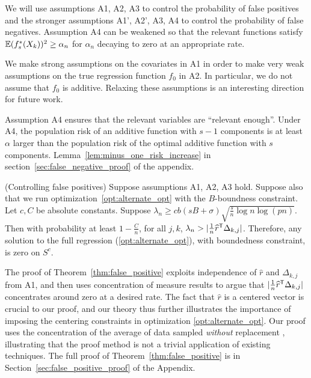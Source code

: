 We will use assumptions A1, A2, A3 to control the probability of false
positives and the stronger assumptions A1', A2', A3, A4 to control the
probability of false negatives.  Assumption A4 can be
weakened so that the relevant functions satisfy
${\mathbb E}(f^*_s(X_k))^2 \geq \alpha_n$ for $\alpha_n$ decaying to zero 
at an appropriate rate.



\begin{remark}
  We make strong assumptions on the covariates in A1 in order to make
  very weak assumptions on the true regression function $f_0$ in
  A2. In particular, we do not assume that $f_0$ is additive. Relaxing
  these assumptions is an interesting direction for future work. 
\end{remark}

\begin{remark}
Assumption A4 ensures that the relevant variables are ``relevant enough''. Under A4, the population risk of an additive function with $s-1$ components is at least $\alpha$ larger than the population risk of the optimal additive function with $s$ components. Lemma~\ref{lem:minus_one_risk_increase} in section~\ref{sec:false_negative_proof} of the appendix.
\end{remark}

\begin{theorem} (Controlling false positives) 
\label{thm:false_positive}
Suppose assumptions A1, A2, A3 hold. Suppose also that we run optimization~\eqref{opt:alternate_opt} with the $B$-boundness constraint. Let $c,C$ be absolute constants.
Suppose $\lambda_n \geq c b (sB + \sigma) \sqrt{ \frac{s}{n} \log n
  \log (pn)}$.  Then with probability at least $ 1 - \frac{C}{n}$, for all $j,k$, $\lambda_n >  | \frac{1}{n} \widehat{r}^{\mathsf{T}} \Delta_{k,j}|$.
Therefore, any solution to the full regression (\ref{opt:alternate_opt}), with boundedness constraint, is zero on $S^c$. 
\end{theorem}

The proof of Theorem~\ref{thm:false_positive} exploits independence of
$\hat{r}$ and $\Delta_{k,j}$ from A1, and then uses concentration of
measure results to argue that $| \frac{1}{n} \widehat{r}^{\mathsf{T}}
\Delta_{k,j}|$ concentrates around zero at a desired rate. The fact
that $\hat{r}$ is a centered vector is crucial to our proof, and our
theory thus further illustrates the importance of imposing the
centering constraints in optimization \eqref{opt:alternate_opt}. Our
proof uses the concentration of the average of
data sampled \emph{without} replacement
\cite{serfling1974probability}, illustrating that the proof method is not a
trivial application of existing techniques. The full proof of
Theorem~\ref{thm:false_positive} is in
Section~\ref{sec:false_positive_proof} of the Appendix.

